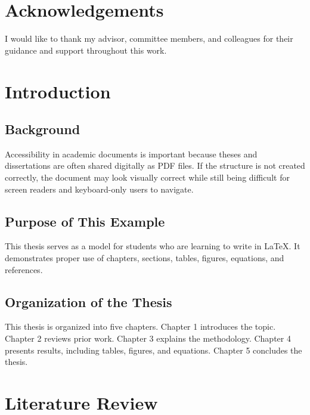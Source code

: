 \documentclass[12pt]{report}
\begin{document}
\chapter*{Acknowledgements} 
 
I would like to thank my advisor, committee members, and colleagues for their guidance and support throughout this work. 
 
\tableofcontents 
\listoftables 
\listoffigures 
 
\clearpage 
{} 
 
\chapter{Introduction} 
\section{Background} 
 
Accessibility in academic documents is important because theses and dissertations are often shared digitally as PDF files. If the structure is not created correctly, the document may look visually correct while still being difficult for screen readers and keyboard-only users to navigate. 
 
\section{Purpose of This Example} 
 
This thesis serves as a model for students who are learning to write in LaTeX. It demonstrates proper use of chapters, sections, tables, figures, equations, and references. 
 
\section{Organization of the Thesis} 
 
This thesis is organized into five chapters. Chapter 1 introduces the topic. Chapter 2 reviews prior work. Chapter 3 explains the methodology. Chapter 4 presents results, including tables, figures, and equations. Chapter 5 concludes the thesis. 
 
\chapter{Literature Review} 
\end{document}
